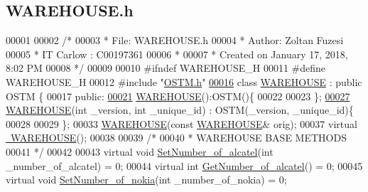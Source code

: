 \hypertarget{_w_a_r_e_h_o_u_s_e_8h_source}{}\subsection{W\+A\+R\+E\+H\+O\+U\+S\+E.\+h}

\begin{DoxyCode}
00001 
00002 \textcolor{comment}{/* }
00003 \textcolor{comment}{ * File:   WAREHOUSE.h}
00004 \textcolor{comment}{* Author: Zoltan Fuzesi}
00005 \textcolor{comment}{ * IT Carlow : C00197361}
00006 \textcolor{comment}{ *}
00007 \textcolor{comment}{ * Created on January 17, 2018, 8:02 PM}
00008 \textcolor{comment}{ */}
00009 
00010 \textcolor{preprocessor}{#ifndef WAREHOUSE\_H}
00011 \textcolor{preprocessor}{#define WAREHOUSE\_H}
00012 \textcolor{preprocessor}{#include "\hyperlink{_o_s_t_m_8h}{OSTM.h}"}
\hypertarget{_w_a_r_e_h_o_u_s_e_8h_source.tex_l00016}{}\hyperlink{class_w_a_r_e_h_o_u_s_e}{00016} \textcolor{keyword}{class }\hyperlink{class_w_a_r_e_h_o_u_s_e}{WAREHOUSE} : \textcolor{keyword}{public} OSTM \{
00017 \textcolor{keyword}{public}:
\hypertarget{_w_a_r_e_h_o_u_s_e_8h_source.tex_l00021}{}\hyperlink{class_w_a_r_e_h_o_u_s_e_a7a924d389af91f54ed0e1d1d8d56ec57}{00021}     \hyperlink{class_w_a_r_e_h_o_u_s_e_a7a924d389af91f54ed0e1d1d8d56ec57}{WAREHOUSE}():OSTM()\{
00022         
00023     \};
\hypertarget{_w_a_r_e_h_o_u_s_e_8h_source.tex_l00027}{}\hyperlink{class_w_a_r_e_h_o_u_s_e_a91a50ed8f6eeb344b1785f750532b18a}{00027}     \hyperlink{class_w_a_r_e_h_o_u_s_e_a91a50ed8f6eeb344b1785f750532b18a}{WAREHOUSE}(\textcolor{keywordtype}{int} \_version, \textcolor{keywordtype}{int} \_unique\_id) : OSTM(\_version, \_unique\_id)\{
00028         
00029     \};
00033     \hyperlink{class_w_a_r_e_h_o_u_s_e_a7a924d389af91f54ed0e1d1d8d56ec57}{WAREHOUSE}(\textcolor{keyword}{const} \hyperlink{class_w_a_r_e_h_o_u_s_e}{WAREHOUSE}& orig);
00037     \textcolor{keyword}{virtual} \hyperlink{class_w_a_r_e_h_o_u_s_e_ad5aa686839d7be9bfea33d469c58086b}{~WAREHOUSE}();
00038     
00039     \textcolor{comment}{/*}
00040 \textcolor{comment}{     * WAREHOUSE BASE METHODS}
00041 \textcolor{comment}{     */}
00042     
00043     \textcolor{keyword}{virtual} \textcolor{keywordtype}{void} \hyperlink{class_w_a_r_e_h_o_u_s_e_aa1353184ecc71cce178d76b77f37158b}{SetNumber\_of\_alcatel}(\textcolor{keywordtype}{int} \_number\_of\_alcatel) = 0;
00044     \textcolor{keyword}{virtual} \textcolor{keywordtype}{int} \hyperlink{class_w_a_r_e_h_o_u_s_e_a2b19e422d84873daecf0e87bf8df900c}{GetNumber\_of\_alcatel}() = 0;
00045     \textcolor{keyword}{virtual} \textcolor{keywordtype}{void} \hyperlink{class_w_a_r_e_h_o_u_s_e_a13ace834a25aab61c689a7cedad94343}{SetNumber\_of\_nokia}(\textcolor{keywordtype}{int} \_number\_of\_nokia) = 0;

\end{DoxyCode}
